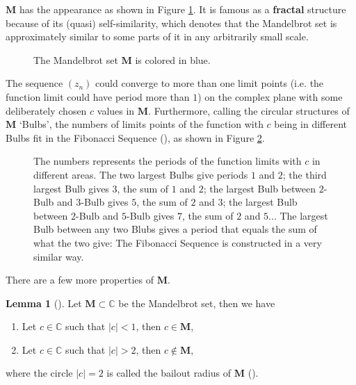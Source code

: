 \documentclass[a4paper,11pt]{article}
\theoremstyle{definition}
\newtheorem{lem}[prop]{Lemma}
\begin{document}
$\mathbf{M}$ has the appearance as shown in Figure \ref{fig:mdbt}. It is famous as a \textbf{fractal} structure because of its (quasi) self-similarity, which denotes that the Mandelbrot set is approximately similar to some parts of it in any arbitrarily small scale. 

\begin{figure}
    \caption{The Mandelbrot set $\mathbf{M}$ is colored in blue.}
    \label{fig:mdbt}
\end{figure}

The sequence $(z_{n})$ could converge to more than one limit points (i.e. the function limit could have period more than $1$) on the complex plane with some deliberately chosen $c$ values in $\mathbf{M}$. Furthermore, calling the circular structures of $\mathbf{M}$ `Bulbs', the numbers of limits points of the function with $c$ being in different Bulbs fit in the Fibonacci Sequence (\autocite[Section 3.2]{emily}), as shown in Figure \ref{fig:prds}.

\begin{figure}
    \caption{\autocite{wikimedia} The numbers represents the periods of the function limits with $c$ in different areas. The two largest Bulbs give periods $1$ and $2$; the third largest Bulb gives $3$, the sum of $1$ and $2$; the largest Bulb between $2$-Bulb and $3$-Bulb gives $5$, the sum of $2$ and $3$; the largest Bulb between $2$-Bulb and $5$-Bulb gives $7$, the sum of $2$ and $5$... The largest Bulb between any two Blubs gives a period that equals the sum of what the two give: The Fibonacci Sequence is constructed in a very similar way.}
    \label{fig:prds}
\end{figure}

There are a few more properties of $\mathbf{M}$.

\begin{lem}[{\autocite[Page 92]{ewing}}]
Let $\mathbf{M} \subset \mathbb{C}$ be the Mandelbrot set, then we have

\begin{enumerate}
    \item Let $c\in\mathbb{C}$ such that $|c|<1$, then $c\in\mathbf{M}$, 
    \item Let $c\in\mathbb{C}$ such that $|c|>2$, then $c\notin\mathbf{M}$, 
\end{enumerate}
where the circle $|c| = 2$ is called the bailout radius of $\mathbf{M}$ (\autocite[Section 3.1]{fredriksson}).
\end{lem}
\end{document}
